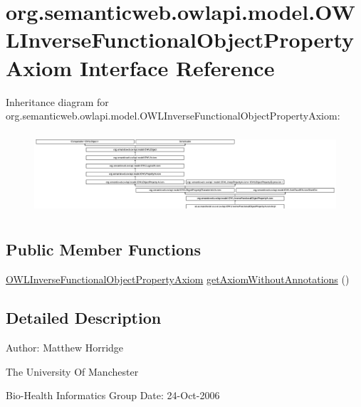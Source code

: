 \hypertarget{interfaceorg_1_1semanticweb_1_1owlapi_1_1model_1_1_o_w_l_inverse_functional_object_property_axiom}{\section{org.\-semanticweb.\-owlapi.\-model.\-O\-W\-L\-Inverse\-Functional\-Object\-Property\-Axiom Interface Reference}
\label{interfaceorg_1_1semanticweb_1_1owlapi_1_1model_1_1_o_w_l_inverse_functional_object_property_axiom}
}
Inheritance diagram for org.\-semanticweb.\-owlapi.\-model.\-O\-W\-L\-Inverse\-Functional\-Object\-Property\-Axiom\-:\begin{figure}[H]
\begin{center}
\leavevmode
\includegraphics[height=3.060109cm]{interfaceorg_1_1semanticweb_1_1owlapi_1_1model_1_1_o_w_l_inverse_functional_object_property_axiom}
\end{center}
\end{figure}
\subsection*{Public Member Functions}
\begin{DoxyCompactItemize}
\item 
\hyperlink{interfaceorg_1_1semanticweb_1_1owlapi_1_1model_1_1_o_w_l_inverse_functional_object_property_axiom}{O\-W\-L\-Inverse\-Functional\-Object\-Property\-Axiom} \hyperlink{interfaceorg_1_1semanticweb_1_1owlapi_1_1model_1_1_o_w_l_inverse_functional_object_property_axiom_ac09f90d274d1139ca10cec59951d826e}{get\-Axiom\-Without\-Annotations} ()
\end{DoxyCompactItemize}


\subsection{Detailed Description}
Author\-: Matthew Horridge\par
 The University Of Manchester\par
 Bio-\/\-Health Informatics Group Date\-: 24-\/\-Oct-\/2006 

